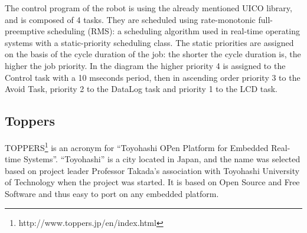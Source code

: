 \begin{figure}[ht]
  \begin{center}
	\hspace{1pt}
  \end{center}
\end{figure}
The control program of the robot is using the already mentioned UICO library, and is composed of 4 tasks. They are scheduled using rate-monotonic full-preemptive scheduling (RMS): a scheduling algorithm used in real-time operating systems with a static-priority scheduling class.
The static priorities are assigned on the basis of the cycle duration of the job: the shorter the cycle duration is, the higher the job priority. In the diagram the higher priority 4 is assigned to the Control task with a 10 mseconds period, then in ascending order priority 3 to the Avoid Task, priority 2 to the DataLog task and priority 1 to the LCD task.

\subsection{Toppers}
TOPPERS\footnote{http://www.toppers.jp/en/index.html} is an acronym for “Toyohashi OPen Platform for Embedded Real-time Systems”. “Toyohashi” is a city located in Japan, and the name was selected based on project leader Professor Takada’s association with Toyohashi University of Technology when the project was started.
It is based on Open Source and Free Software and thus easy to port on any
embedded platform.

